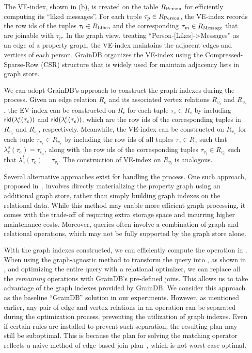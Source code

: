 The VE-index, shown in (b), is created on the table ${R_{\text{Person}}}$ for efficiently computing its ``liked messages''. For each tuple $\tau_{p} \in {\ensuremath R_{\text{Person}}}$, the VE-index records the row ids of the tuples $\tau_{l} \in {\ensuremath R_{\text{Likes}}}$ and the corresponding $\tau_{m} \in {\ensuremath R_{\text{Message}}}$ that are joinable with $\tau_{p}$. In the graph view, treating ``Person-[Likes]->Messages'' as an edge of a property graph, the VE-index maintains the adjacent edges and vertices of each person. GrainDB organizes the VE-index using the Compressed-Sparse-Row (CSR) structure that is widely used for maintain adjacency lists in graph store.

We can adopt GrainDB's approach to construct the graph indexes during the \rgmapping process. Given an edge relation $R_e$ and its associated vertex relations $R_{v_s}$ and $R_{v_t}$, the EV-index can be constructed on $R_e$ for each tuple $\tau_e \in R_e$ by including ${\mathsf{rid}}(\lambda_e^s(\tau_e))$ and ${\mathsf{rid}}(\lambda_e^t(\tau_e))$, which are the row ids of the corresponding tuples in $R_{v_s}$ and $R_{v_t}$, respectively. Meanwhile, the VE-index can be constructed on $R_{v_s}$ for each tuple $\tau_{v_s} \in R_{v_s}$ by including the row ids of all tuples $\tau_e \in R_e$ such that $\lambda_e^s(\tau_e) = \tau_{v_s}$, along with the row ids of the corresponding tuples $\tau_{v_t} \in R_{v_t}$ such that $\lambda_e^t(\tau_e) = \tau_{v_t}$.
The construction of VE-index on $R_{v_t}$ is analogous.

\begin{remark}
  Several alternative approaches exist for handling the \rgmapping process. One such approach, proposed in~\cite{gart}, involves directly materializing the property graph using an additional graph store, rather than simply building graph indexes on the relational data. While this method may enable more efficient graph processing, it comes with the trade-off of requiring extra storage space and incurring higher maintenance costs. Moreover, \spjm queries often involve a combination of graph and relational operations, which may not be fully supported by the graph store alone.
\end{remark}

With the graph indexes constructed, we can efficiently compute the \EVjoin operation in .
When using the graph-agnostic method to transform the \spjm query into \spj, as shown in , and optimizing the entire \spj query with a relational optimizer, we can replace all the \emph{remaining} \EVjoin operations with GrainDB's pre-defined joins. This allows us to take advantage of the graph indexes provided by GrainDB. We consider this approach as the baseline ``GrainDB'' solution in our experiments.
However, as mentioned earlier, any pair of edge and vertex relations in an \EVjoin operation can be separated during the optimization process, preventing the utilization of graph indexes. Even if certain rules are installed to prevent such separation, the resulting plan may still be suboptimal. This is because the plan for solving the matching operator reflects a naive method of edge-based join plan~\cite{lai2019distributed}, which is not worst-case optimal. 

